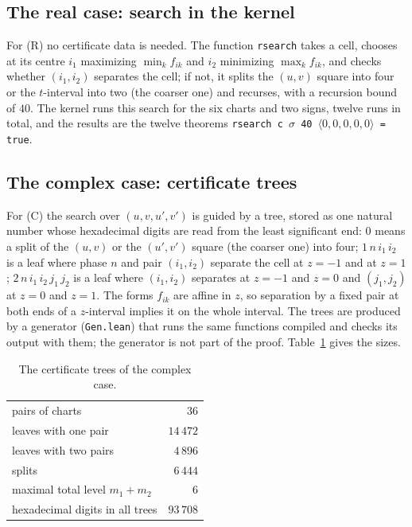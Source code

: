 \documentclass[11pt]{article}
\theoremstyle{definition}
\theoremstyle{remark}
\begin{document}
\subsection{The real case: search in the kernel}
For (R) no certificate data is needed. The function \texttt{rsearch} takes a cell, chooses at its
centre $i_1$ maximizing $\min_kf_{ik}$ and $i_2$ minimizing $\max_kf_{ik}$, and checks whether
$(i_1,i_2)$ separates the cell; if not, it splits the $(u,v)$ square into four or the $t$-interval
into two (the coarser one) and recurses, with a recursion bound of $40$. The kernel runs this search
for the six charts and two signs, twelve runs in total, and the results are the twelve theorems
\texttt{rsearch c $\sigma$ 40 $\langle0,0,0,0,0\rangle$ = true}.

\subsection{The complex case: certificate trees}
For (C) the search over $(u,v,u',v')$ is guided by a tree, stored as one natural number whose
hexadecimal digits are read from the least significant end: $0$ means a split of the $(u,v)$ or the
$(u',v')$ square (the coarser one) into four; $1\,n\,i_1\,i_2$ is a leaf where phase $n$ and pair
$(i_1,i_2)$ separate the cell at $z=-1$ and at $z=1$; $2\,n\,i_1\,i_2\,j_1\,j_2$ is a leaf where
$(i_1,i_2)$ separates at $z=-1$ and $z=0$ and $(j_1,j_2)$ at $z=0$ and $z=1$. The forms $f_{ik}$ are
affine in $z$, so separation by a fixed pair at both ends of a $z$-interval implies it on the whole
interval. The trees are produced by a generator (\texttt{Gen.lean}) that runs the same functions
compiled and checks its output with them; the generator is not part of the proof. Table~\ref{tab:stats}
gives the sizes.

\begin{table}[ht]
\centering
\begin{tabular}{lr}
\toprule
pairs of charts & $36$\\
leaves with one pair & $14\,472$\\
leaves with two pairs & $4\,896$\\
splits & $6\,444$\\
maximal total level $m_1+m_2$ & $6$\\
hexadecimal digits in all trees & $93\,708$\\
\bottomrule
\end{tabular}
\caption{The certificate trees of the complex case.}
\label{tab:stats}
\end{table}
\end{document}
